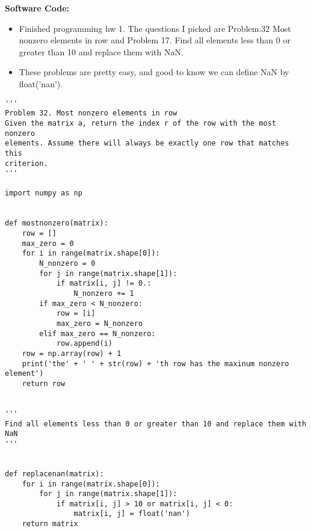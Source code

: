 \documentclass{article}
\begin{document}
\textbf{Software Code:}
\begin{itemize}
\item Finished programming hw 1. The questions I picked are Problem.32  Most nonzero elements in row  and Problem 17. Find all elements less than 0 or greater than 10 and replace them with NaN. 
\item These problems are pretty easy, and good to know we can define NaN by float('nan').
\end{itemize}
\begin{verbatim}
'''
Problem 32. Most nonzero elements in row
Given the matrix a, return the index r of the row with the most nonzero
elements. Assume there will always be exactly one row that matches this
criterion.
'''

import numpy as np


def mostnonzero(matrix):
    row = []
    max_zero = 0
    for i in range(matrix.shape[0]):
        N_nonzero = 0
        for j in range(matrix.shape[1]):
            if matrix[i, j] != 0.:
                N_nonzero += 1
        if max_zero < N_nonzero:
            row = [i]
            max_zero = N_nonzero
        elif max_zero == N_nonzero:
            row.append(i)
    row = np.array(row) + 1
    print('the' + ' ' + str(row) + 'th row has the maxinum nonzero element')
    return row


'''
Find all elements less than 0 or greater than 10 and replace them with NaN
'''


def replacenan(matrix):
    for i in range(matrix.shape[0]):
        for j in range(matrix.shape[1]):
            if matrix[i, j] > 10 or matrix[i, j] < 0:
                matrix[i, j] = float('nan')
    return matrix
\end{verbatim} 
\end{document}
